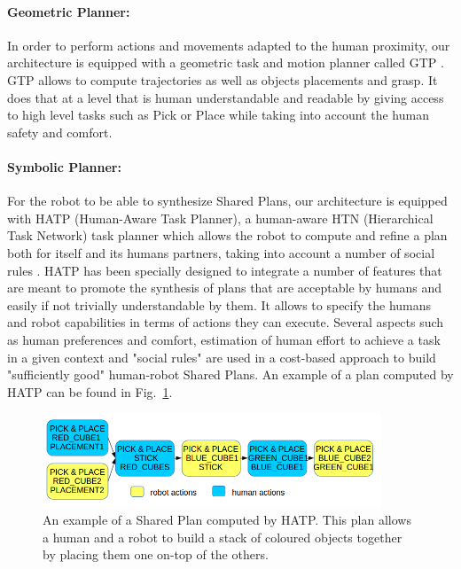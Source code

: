 \documentclass[english,a4paper,11pt,twoside]{StyleThese}
\begin{document}
\paragraph{Geometric Planner:}
In order to perform actions and movements adapted to the human proximity, our architecture is equipped with a geometric task and motion planner called GTP \cite{waldhart2016novel}. GTP allows to compute trajectories as well as objects placements and grasp. It does that at a level that is human understandable and readable by giving access to high level tasks such as Pick or Place while taking into account the human safety and comfort.

\paragraph{Symbolic Planner:}
For the robot to be able to synthesize Shared Plans, our architecture is equipped with HATP (Human-Aware Task Planner), a human-aware HTN (Hierarchical Task Network) task planner which allows the robot to compute and refine a plan both for itself and its humans partners, taking into account a number of social rules \cite{Lallement2014hatp}.
HATP has been specially designed to integrate a number of features that are meant to promote the synthesis of plans that are acceptable by humans and easily if not trivially understandable by them. It allows to specify the humans and robot capabilities in terms of actions they can execute. Several aspects such as human preferences and comfort, estimation of human effort to achieve a task in a given context and "social rules" are used in a cost-based approach to build "sufficiently good" human-robot Shared Plans. An example of a plan computed by HATP can be found in Fig.~\ref{fig:planHATP}.

\begin{figure}[!h]
	\centering
    \includegraphics[width=0.9\textwidth]{figs/Chapter2/SharedPlan.png}
    \caption{An example of a Shared Plan computed by HATP. This plan allows a human and a robot to build a stack of coloured objects together by placing them one on-top of the others.}
    \label{fig:planHATP}
\end{figure}
\end{document}
